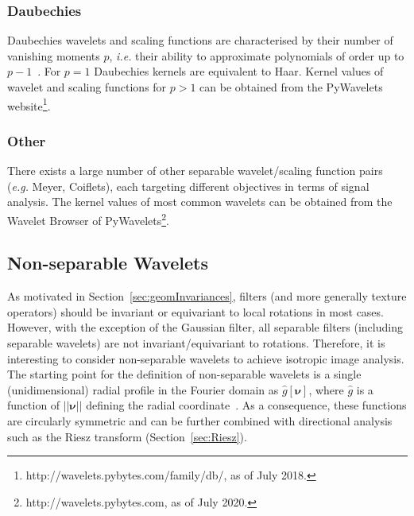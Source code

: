 \documentclass[fleqn,a4paper,oneside,openany]{book}
\begin{document}
\subsubsection{Daubechies}\label{sec:daubechies}
%
Daubechies wavelets and scaling functions are characterised by their number of vanishing moments $p$, \textit{i.e.} their ability to approximate polynomials of order up to $p-1$~\cite{Dau1992}.
For $p=1$ Daubechies kernels are equivalent to Haar.
Kernel values of wavelet and scaling functions for $p>1$ can be obtained from the PyWavelets website\footnote{http://wavelets.pybytes.com/family/db/, as of July 2018.}.
%
\subsubsection{Other}\label{sec:otherWavelets}
%
There exists a large number of other separable wavelet/scaling function pairs (\textit{e.g.} Meyer, Coiflets), each targeting different objectives in terms of signal analysis. The kernel values of most common wavelets can be obtained from the Wavelet Browser of PyWavelets\footnote{http://wavelets.pybytes.com, as of July 2020.}.
%
\subsection{Non-separable Wavelets}\label{sec:nonseparableWavelets}
%
As motivated in  Section~\ref{sec:geomInvariances}, filters (and more generally texture operators) should be invariant or equivariant to local rotations in most cases. 
However, with the exception of the Gaussian filter, all separable filters (including separable wavelets) are not invariant/equivariant to rotations.
Therefore, it is interesting to consider non-separable wavelets to achieve isotropic image analysis.
The starting point for the definition of non-separable wavelets is a single (unidimensional) radial profile in the Fourier domain as $\hat{g}[\boldsymbol{\nu}]$, where $\hat{g}$ is a function of $||\boldsymbol{\nu}||$ defining the radial coordinate~\cite{UCV2011}.
As a consequence, these functions are circularly symmetric and can be further combined with directional analysis such as the Riesz transform (Section~\ref{sec:Riesz}).
\end{document}
